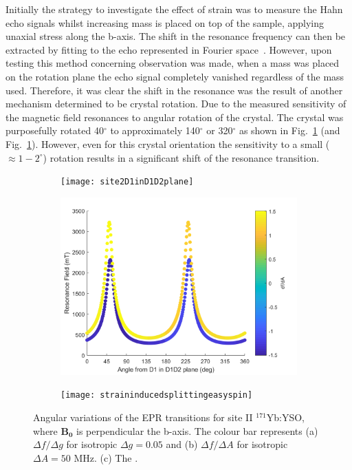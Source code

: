 Initially the strategy to investigate the effect of strain was to measure the Hahn echo signals whilst increasing mass is placed on top of the sample, applying unaxial stress along the b-axis. The shift in the resonance frequency can then be extracted by fitting to the echo represented in Fourier space~\citep{PhysRevLett.120.167701}. However, upon testing this method concerning observation was made, when a mass was placed on the rotation plane the echo signal completely vanished regardless of the mass used. Therefore, it was clear the shift in the resonance was the result of another mechanism determined to be crystal rotation. Due to the measured sensitivity of the magnetic field resonances to angular rotation of the crystal. The crystal was purposefully rotated 40$^{\circ}$ to approximately 140$^{\circ}$ or 320$^{\circ}$ as shown in Fig.~\ref{fig:site2D1inD1D2plane} (and Fig.~\ref{fig:site2D1inD1D2plane}). However, even for this crystal orientation the sensitivity to a small ($\approx 1-2^{\circ}$) rotation results in a significant shift of the resonance transition. 

\begin{figure}[H]
    \centering
    \begin{subfigure}[b]{0.45\textwidth}
        \centering
        \texttt{[image: site2D1inD1D2plane]}
        \caption{\label{fig:site2D1inD1D2plane}}
    \end{subfigure}
    \begin{subfigure}[b]{0.45\textwidth}
        \centering
        \includegraphics[width=\textwidth]{site2D1inD1D2planeA}
   \caption{\label{fig:site2D1inD1D2planeA}}
   \end{subfigure}
       \begin{subfigure}[b]{0.45\textwidth}
        \centering
        \texttt{[image: straininducedsplittingeasyspin]}
   \caption{\label{fig:straininducedsplittingeasyspin}}
   \end{subfigure}
    \caption{Angular variations of the EPR transitions for site II $^{171}$Yb:YSO, where $\bm{B_{0}}$ is perpendicular the b-axis. The colour bar represents (a) $\Delta f/\Delta g$ for isotropic $\Delta g = 0.05$ and (b) $\Delta f/\Delta A$ for isotropic $\Delta A = 50$ MHz. (c) The 
    .}
\end{figure}


